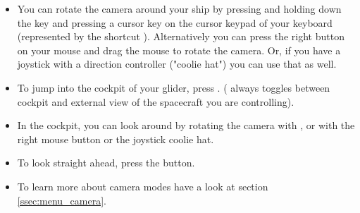 \documentclass[Orbiter User Manual.tex]{subfiles}
\begin{document}
\begin{itemize}
	\item You can rotate the camera around your ship by pressing and holding
		down the \Ctrl{} key and pressing a cursor key on the cursor keypad of
		your keyboard (represented by the shortcut \Arrows\cur{}).
		Alternatively you can press the right button on your mouse and drag the
		mouse to rotate the camera. Or, if you have a joystick with a direction
		controller ("coolie hat") you can use that as well.
	\item To jump into the cockpit of your glider, press .
		( always toggles between cockpit and external view of the
		spacecraft you are controlling).
	\item In the cockpit, you can look around by rotating the camera with
		\keystroke{\alt,\arrows}\cur{}, or with the right mouse button or the
		joystick coolie hat.
	\item To look straight ahead, press the \Home{} button.
	\item To learn more about camera modes have a look at section
		\ref{ssec:menu_camera}.
\end{itemize}
\end{document}
